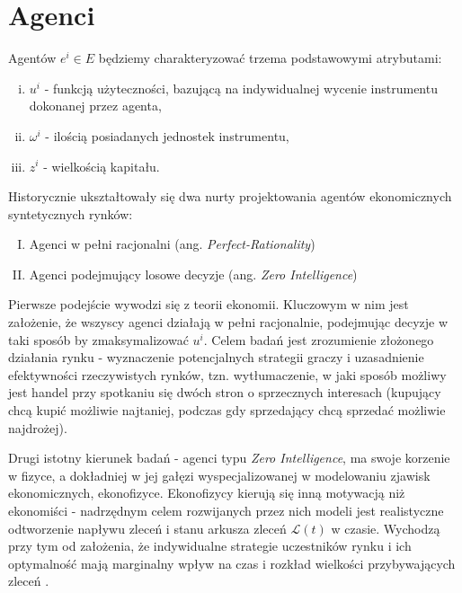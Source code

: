 {\section{Agenci}
Agentów $e^i \in E$ będziemy charakteryzować trzema podstawowymi atrybutami: 
\begin{enumerate}[i.]
\item $u^i$ - funkcją użyteczności, bazującą na indywidualnej wycenie instrumentu dokonanej przez agenta,
\item $\omega^i$ - ilością posiadanych jednostek instrumentu, 
\item $z^i$ - wielkością kapitału.
\end{enumerate}
Historycznie ukształtowały się dwa nurty \cite{lobbib} projektowania agentów ekonomicznych syntetycznych rynków: 
\begin{enumerate}[I.]
\item Agenci w pełni racjonalni (ang. \textit{Perfect-Rationality})
\item Agenci podejmujący losowe decyzje (ang. \textit{Zero Intelligence})
\end{enumerate}
Pierwsze podejście wywodzi się z teorii ekonomii. Kluczowym w nim jest założenie, że wszyscy agenci działają w pełni racjonalnie, podejmując decyzje w taki sposób by zmaksymalizować $u^i$. Celem badań jest zrozumienie złożonego działania rynku - wyznaczenie potencjalnych strategii graczy i uzasadnienie efektywności rzeczywistych rynków, tzn. wytłumaczenie, w jaki sposób możliwy jest handel przy spotkaniu się dwóch stron o sprzecznych interesach (kupujący chcą kupić możliwie najtaniej, podczas gdy sprzedający chcą sprzedać możliwie najdrożej).

Drugi istotny kierunek badań - agenci typu \textit{Zero Intelligence}, ma swoje korzenie w fizyce, a dokładniej w jej gałęzi wyspecjalizowanej w modelowaniu zjawisk ekonomicznych, ekonofizyce. Ekonofizycy kierują się inną motywacją niż ekonomiści - nadrzędnym celem rozwijanych przez nich modeli jest realistyczne odtworzenie napływu zleceń i stanu arkusza zleceń $\mathcal{L}(t)$ w czasie. Wychodzą przy tym od założenia, że indywidualne strategie uczestników rynku i ich optymalność mają marginalny wpływ na czas i rozkład wielkości przybywających zleceń \cite{godesunder}.

}
